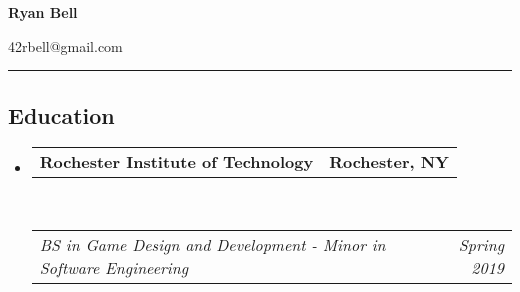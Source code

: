 \documentclass[10pt, letterpaper]{article}
\makeatletter
\newcommand{\headerrow}[2]
{\begin{tabular*}{\linewidth}{l@{\extracolsep{\fill}}r}
	#1 &
	#2 \\
\end{tabular*}}
\makeatother
\begin{document}
\begin{center}
  {\LARGE \textbf{Ryan Bell}}
\\
\end{center}
\noindent
{}\hfill 42rbell@gmail.com\hfill
{}\\
\hrule

\subsection*{Education}
\begin{itemize}
	\parskip=0.1em
  \item[]
	\headerrow
		{\textbf{Rochester Institute of Technology}}
		{\textbf{Rochester, NY}}
	\\
	\headerrow
		{\emph{BS in Game Design and Development - Minor in Software Engineering}}
		{\emph{Spring 2019}}
\end{itemize}
\end{document}
